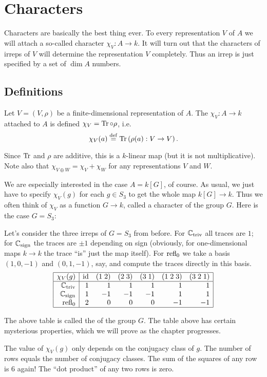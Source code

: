 \chapter{Characters}
Characters are basically the best thing ever.
To every representation $V$ of $A$ we will attach a
so-called character $\chi_V : A \to k$.
It will turn out that the characters of irreps of $V$
will determine the representation $V$ completely.
Thus an irrep is just specified by a set of $\dim A$ numbers.

\section{Definitions}
\begin{definition}
	Let $V = (V, \rho)$ be a finite-dimensional representation of $A$.
	The  $\chi_V : A \to k$ attached to
	$A$ is defined $\chi_V = \operatorname{Tr} \circ \rho$, i.e.\
	\[ \chi_V(a) \overset{\mathrm{def}}{=} \operatorname{Tr}\left( \rho(a) : V \to V \right). \]
\end{definition}
Since $\operatorname{Tr}$ and $\rho$ are additive, this is a $k$-linear map
(but it is not multiplicative).
Note also that $\chi_{V \oplus W} = \chi_V + \chi_W$
for any representations $V$ and $W$.

We are especially interested in the case $A = k[G]$, of course.
As usual, we just have to specify $\chi_V(g)$ for each
$g \in S_3$ to get the whole map $k[G] \to k$.
Thus we often think of $\chi_V$ as a function $G \to k$,
called a character of the group $G$.
Here is the case $G = S_3$:
\begin{example}
	Let's consider the three irreps of $G = S_3$ from before.
	For $\mathbb C_{\text{triv}}$ all traces are $1$;
	for $\mathbb C_{\text{sign}}$ the traces are $\pm 1$ depending on sign
	(obviously, for one-dimensional maps $k \to k$ the trace ``is''
	just the map itself).
	For $\operatorname{refl}_0$ we take a basis $(1,0,-1)$ and $(0,1,-1)$, say,
	and compute the traces directly in this basis.
	\[
		\begin{array}{|r|rrrrrr|}
			\hline
			\chi_V(g) & \mathrm{id} & (1\;2) & (2\;3) & (3\;1) 
				& (1\;2\;3) & (3\;2\;1)  \\ \hline
			\mathbb C_{\mathrm{triv}} & 1 & 1 & 1 & 1 & 1 & 1 \\
			\mathbb C_{\mathrm{sign}} & 1 & -1 & -1 & -1 & 1 & 1 \\
			\operatorname{refl}_0 & 2 & 0 & 0 & 0 & -1 & -1 \\ \hline
		\end{array}
	\]
\end{example}
The above table is called the  of the group $G$.
The table above has certain mysterious properties,
which we will prove as the chapter progresses.
\begin{enumerate}[(I)]
	\ii The value of $\chi_V(g)$ only depends on the conjugacy class of $g$.
	\ii The number of rows equals the number of conjugacy classes.
	\ii The sum of the squares of any row is $6$ again!
	\ii The ``dot product'' of any two rows is zero.
\end{enumerate}

